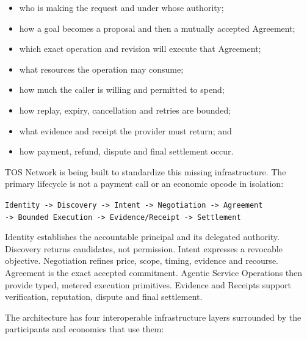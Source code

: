\documentclass[11pt,oneside]{article}
\begin{document}
\begin{itemize}
  \item who is making the request and under whose authority;
  \item how a goal becomes a proposal and then a mutually accepted Agreement;
  \item which exact operation and revision will execute that Agreement;
  \item what resources the operation may consume;
  \item how much the caller is willing and permitted to spend;
  \item how replay, expiry, cancellation and retries are bounded;
  \item what evidence and receipt the provider must return; and
  \item how payment, refund, dispute and final settlement occur.
\end{itemize}

TOS Network is being built to standardize this missing infrastructure. The primary lifecycle
is not a payment call or an economic opcode in isolation:

\begin{center}
\texttt{Identity -> Discovery -> Intent -> Negotiation -> Agreement}\\
\texttt{-> Bounded Execution -> Evidence/Receipt -> Settlement}
\end{center}

Identity establishes the accountable principal and its delegated authority. Discovery returns
candidates, not permission. Intent expresses a revocable objective. Negotiation refines price,
scope, timing, evidence and recourse. Agreement is the exact accepted commitment. Agentic
Service Operations then provide typed, metered execution primitives. Evidence and Receipts
support verification, reputation, dispute and final settlement.

\begin{center}
\end{center}

The architecture has four interoperable infrastructure layers surrounded by the participants
and economies that use them:
\end{document}
